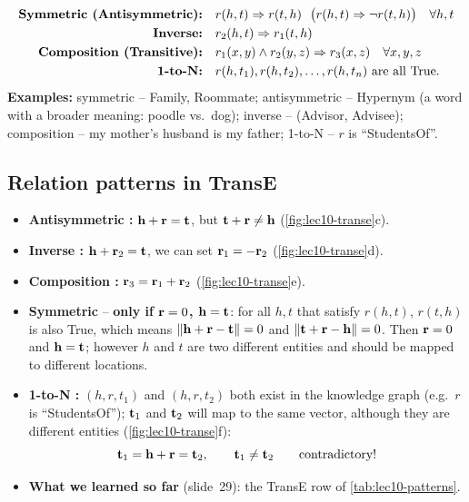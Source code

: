 \begin{definition}\label{def:lec10-patterns}
  \begin{align}
    \text{\textbf{Symmetric (Antisymmetric):}}\quad
      & r(h,t)\Rightarrow r(t,h)\ \ \big(r(h,t)\Rightarrow\neg r(t,h)\big)
        \quad\forall h,t \label{eq:lec10-sym}\\
    \text{\textbf{Inverse:}}\quad
      & r_2(h,t)\Rightarrow r_1(t,h) \label{eq:lec10-inv}\\
    \text{\textbf{Composition (Transitive):}}\quad
      & r_1(x,y)\wedge r_2(y,z)\Rightarrow r_3(x,z)\quad\forall x,y,z
        \label{eq:lec10-comp}\\
    \text{\textbf{1-to-N:}}\quad
      & r(h,t_1), r(h,t_2),\dots,r(h,t_n)\ \text{are all True.}
        \label{eq:lec10-1toN}
  \end{align}
  \textbf{Examples:} symmetric -- Family, Roommate; antisymmetric -- Hypernym (a
  word with a broader meaning: poodle vs.\ dog); inverse -- (Advisor, Advisee);
  composition -- my mother's husband is my father; 1-to-N -- $r$ is
  ``StudentsOf''.
\end{definition}

\subsection{Relation patterns in TransE}\label{sec:lec10-transe-patterns}

\begin{itemize}
  \item \textbf{Antisymmetric \cmark:} $\mathbf{h}+\mathbf{r}=\mathbf{t}$, but $\mathbf{t}+\mathbf{r}\neq\mathbf{h}$
    (\cref{fig:lec10-transe}c).
  \item \textbf{Inverse \cmark:} $\mathbf{h}+\mathbf{r}_2=\mathbf{t}$, we can set $\mathbf{r}_1=-\mathbf{r}_2$
    (\cref{fig:lec10-transe}d).
  \item \textbf{Composition \cmark:} $\mathbf{r}_3=\mathbf{r}_1+\mathbf{r}_2$
    (\cref{fig:lec10-transe}e).
  \item \textbf{Symmetric \xmark} -- \textbf{only if $\mathbf{r}=0$, $\mathbf{h}=\mathbf{t}$}: for all
    $h,t$ that satisfy $r(h,t)$, $r(t,h)$ is also True, which means
    $\left\lVert \mathbf{h}+\mathbf{r}-\mathbf{t} \right\rVert=0$ and $\left\lVert \mathbf{t}+\mathbf{r}-\mathbf{h} \right\rVert=0$. Then $\mathbf{r}=0$ and
    $\mathbf{h}=\mathbf{t}$; however $h$ and $t$ are two different entities and should be
    mapped to different locations.
  \item \textbf{1-to-N \xmark:} $(h,r,t_1)$ and $(h,r,t_2)$ both exist in the
    knowledge graph (e.g.\ $r$ is ``StudentsOf''); $\mathbf{t}_1$ and $\mathbf{t}_2$ will map to
    the same vector, although they are different entities
    (\cref{fig:lec10-transe}f):
    \[
      \mathbf{t}_1=\mathbf{h}+\mathbf{r}=\mathbf{t}_2,\qquad \mathbf{t}_1\neq\mathbf{t}_2\qquad\text{contradictory!}
    \]
  \item \textbf{What we learned so far} (slide~29): the TransE row of
    \cref{tab:lec10-patterns}.
\end{itemize}


